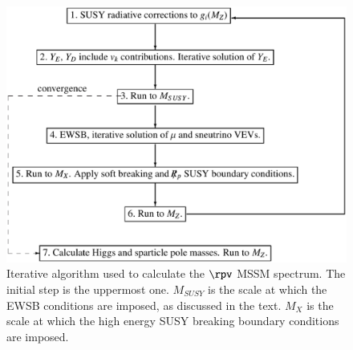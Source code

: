 \documentclass[final,3p,times,pdflatex]{elsarticle}
\begin{document}
\begin{figure}
\begin{center}
\includegraphics[width=330pt]{rpvalg.eps}
\end{center}
\caption{Iterative algorithm used to calculate the $\rpv$ MSSM spectrum. 
The initial step is the
uppermost one. $M_{SUSY}$ is the scale at which the EWSB
conditions 
are imposed, as discussed in the text. $M_X$ is the scale at which the high
energy SUSY breaking boundary conditions are imposed.
\label{fig:algorithm}}
\end{figure}
\end{document}
